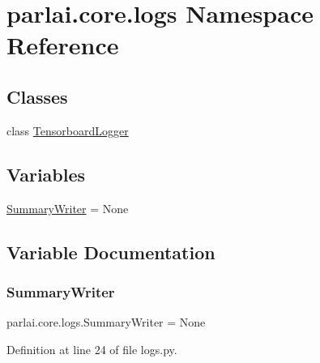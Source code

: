 \hypertarget{namespaceparlai_1_1core_1_1logs}{}\section{parlai.\+core.\+logs Namespace Reference}
\label{namespaceparlai_1_1core_1_1logs}
\subsection*{Classes}
\begin{DoxyCompactItemize}
\item 
class \hyperlink{classparlai_1_1core_1_1logs_1_1TensorboardLogger}{Tensorboard\+Logger}
\end{DoxyCompactItemize}
\subsection*{Variables}
\begin{DoxyCompactItemize}
\item 
\hyperlink{namespaceparlai_1_1core_1_1logs_a214c91224d7834e7962d77d49f17bbc4}{Summary\+Writer} = None
\end{DoxyCompactItemize}


\subsection{Variable Documentation}
\mbox{\label{namespaceparlai_1_1core_1_1logs_a214c91224d7834e7962d77d49f17bbc4}} 
\subsubsection{\texorpdfstring{Summary\+Writer}{SummaryWriter}}
{\footnotesize\ttfamily parlai.\+core.\+logs.\+Summary\+Writer = None}



Definition at line 24 of file logs.\+py.

